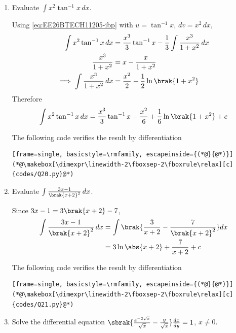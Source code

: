 \begin{enumerate}[label=\thesubsection.\arabic*, ref=\thesubsection.\theenumi, itemsep=3ex]
\item
Evaluate $\int x^2\tan^{-1}x\,dx$.

\medskip
\solution Using \eqref{eq:EE26BTECH11205-ibp} with $u = \tan^{-1}x$, $dv = x^2\,dx$,
\begin{align}
	\int x^2\tan^{-1}x\,dx &= \frac{x^3}{3}\tan^{-1}x - \frac{1}{3}\int\frac{x^3}{1+x^2}\,dx
	\\
	\frac{x^3}{1+x^2} &= x - \frac{x}{1+x^2} \notag
	\\
	\implies \int\frac{x^3}{1+x^2}\,dx &= \frac{x^2}{2} - \frac{1}{2}\ln\brak{1+x^2}
\end{align}
Therefore
\begin{align}
	\int x^2\tan^{-1}x\,dx = \frac{x^3}{3}\tan^{-1}x - \frac{x^2}{6} + \frac{1}{6}\ln\brak{1+x^2} + c
\end{align}

\medskip
The following code verifies the result by differentiation
\begin{lstlisting}[frame=single, basicstyle=\rmfamily, escapeinside={(*@}{@*)}]
(*@\makebox[\dimexpr\linewidth-2\fboxsep-2\fboxrule\relax][c]{codes/Q20.py}@*)
\end{lstlisting}

\item
Evaluate $\int\frac{3x-1}{\brak{x+2}^2}\,dx$.

\medskip
\solution Since $3x - 1 = 3\brak{x+2} - 7$,
\begin{align}
	\int\frac{3x-1}{\brak{x+2}^2}\,dx &= \int\brak{\frac{3}{x+2} - \frac{7}{\brak{x+2}^2}}dx \notag
	\\
	&= 3\ln\abs{x+2} + \frac{7}{x+2} + c
\end{align}

\medskip
The following code verifies the result by differentiation
\begin{lstlisting}[frame=single, basicstyle=\rmfamily, escapeinside={(*@}{@*)}]
(*@\makebox[\dimexpr\linewidth-2\fboxsep-2\fboxrule\relax][c]{codes/Q21.py}@*)
\end{lstlisting}

\item
Solve the differential equation $\sbrak{\frac{e^{-2\sqrt{x}}}{\sqrt{x}} - \frac{y}{\sqrt{x}}}\frac{dx}{dy} = 1$, $x \neq 0$.


\end{enumerate}

